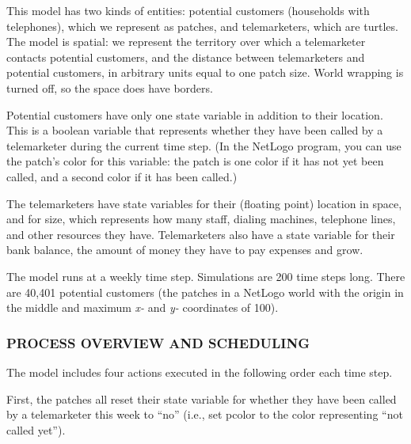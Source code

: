 \documentclass[]{article}
\begin{document}
This model has two kinds of entities: potential customers (households
with telephones), which we represent as patches, and telemarketers,
which are turtles. The model is spatial: we represent the territory over
which a telemarketer contacts potential customers, and the distance
between telemarketers and potential customers, in arbitrary units equal
to one patch size. World wrapping is turned off, so the space does have
borders.

Potential customers have only one state variable in addition to their
location. This is a boolean variable that represents whether they have
been called by a telemarketer during the current time step. (In the
NetLogo program, you can use the patch's color for this variable: the
patch is one color if it has not yet been called, and a second color if
it has been called.)

The telemarketers have state variables for their (floating point)
location in space, and for size, which represents how many staff,
dialing machines, telephone lines, and other resources they have.
Telemarketers also have a state variable for their bank balance, the
amount of money they have to pay expenses and grow.

The model runs at a weekly time step. Simulations are 200 time steps
long. There are 40,401 potential customers (the patches in a NetLogo
world with the origin in the middle and maximum \emph{x-} and \emph{y-}
coordinates of 100).

\hypertarget{process-overview-and-scheduling}{%
\subsubsection{PROCESS OVERVIEW AND
SCHEDULING}\label{process-overview-and-scheduling}}

The model includes four actions executed in the following order each
time step.

First, the patches all reset their state variable for whether they have
been called by a telemarketer this week to ``no'' (i.e., set pcolor to
the color representing ``not called yet'').
\end{document}
